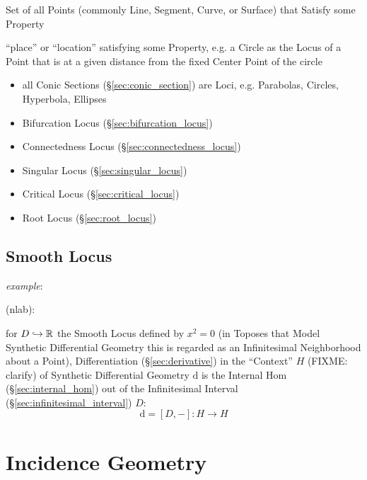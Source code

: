 
Set of all Points (commonly Line, Segment, Curve, or Surface) that Satisfy some
Property

``place'' or ``location'' satisfying some Property, e.g. a Circle as the Locus
of a Point that is at a given distance from the fixed Center Point of the circle

\begin{itemize}
  \item all Conic Sections (\S\ref{sec:conic_section}) are Loci, e.g. Parabolas,
    Circles, Hyperbola, Ellipses
  \item Bifurcation Locus (\S\ref{sec:bifurcation_locus})
  \item Connectedness Locus (\S\ref{sec:connectedness_locus})
  \item Singular Locus (\S\ref{sec:singular_locus})
  \item Critical Locus (\S\ref{sec:critical_locus})
  \item Root Locus (\S\ref{sec:root_locus})
\end{itemize}




\subsection{Smooth Locus}\label{sec:smooth_locus}


\emph{example}:

(nlab):

for $D \hookrightarrow \mathbb{R}$ the Smooth Locus defined by $x^2 = 0$ (in Toposes
that Model Synthetic Differential Geometry this is regarded as an Infinitesimal
Neighborhood about a Point), Differentiation (\S\ref{sec:derivative}) in the
``Context'' $H$ (FIXME: clarify) of Synthetic Differential Geometry $\mathrm{d}$
is the Internal Hom (\S\ref{sec:internal_hom}) out of the Infinitesimal Interval
(\S\ref{sec:infinitesimal_interval}) $D$:
\[
  \mathrm{d} = [D,-] : H \rightarrow H
\]



\section{Incidence Geometry}\label{sec:incidence_geometry}

